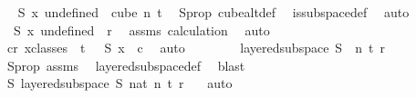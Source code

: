 \begin{isabellebody}
\ \isamarkupfalse%
\ {\isachardoublequoteopen}S\ {\isacharparenleft}{\kern0pt}{\isasymlambda}x{\isachardot}{\kern0pt}\ undefined{\isacharparenright}{\kern0pt}\ {\isasymin}\ cube\ n\ {\isacharparenleft}{\kern0pt}t{\isacharplus}{\kern0pt}{}{\isacharparenright}{\kern0pt}{\isachardoublequoteclose}\ \isamarkupfalse%
\ S{\isacharunderscore}{\kern0pt}prop\ cube{}{\isacharunderscore}{\kern0pt}alt{\isacharunderscore}{\kern0pt}def\ \isamarkupfalse%
\ is{\isacharunderscore}{\kern0pt}subspace{\isacharunderscore}{\kern0pt}def\ \isamarkupfalse%
\ auto\isanewline
\ \ \ \ \isamarkupfalse%
\ \isamarkupfalse%
\ {\isachardoublequoteopen}{\isasymchi}\ {\isacharparenleft}{\kern0pt}S\ {\isacharparenleft}{\kern0pt}{\isasymlambda}x{\isachardot}{\kern0pt}\ undefined{\isacharparenright}{\kern0pt}{\isacharparenright}{\kern0pt}\ {\isacharless}{\kern0pt}\ r{\isachardoublequoteclose}\ \isamarkupfalse%
\ assms\ calculation\ \isamarkupfalse%
\ auto\isanewline
\ \ \ \ \isamarkupfalse%
\ \isamarkupfalse%
\ {\isachardoublequoteopen}{\isasymexists}c{\isacharless}{\kern0pt}r{\isachardot}{\kern0pt}\ {\isasymforall}x{\isasymin}classes\ {}\ t\ {}{\isachardot}{\kern0pt}\ {\isasymchi}\ {\isacharparenleft}{\kern0pt}S\ x{\isacharparenright}{\kern0pt}\ {\isacharequal}{\kern0pt}\ c{\isachardoublequoteclose}\ \isamarkupfalse%
\ auto\isanewline
\ \ \isamarkupfalse%
\isanewline
\ \ \isamarkupfalse%
\ \isamarkupfalse%
\ {\isachardoublequoteopen}layered{\isacharunderscore}{\kern0pt}subspace\ S\ {}\ n\ t\ r\ {\isasymchi}{\isachardoublequoteclose}\ \isamarkupfalse%
\ S{\isacharunderscore}{\kern0pt}prop\ assms\ \isamarkupfalse%
\ layered{\isacharunderscore}{\kern0pt}subspace{\isacharunderscore}{\kern0pt}def\ \isamarkupfalse%
\ blast\isanewline
\ \ \isamarkupfalse%
\ \isamarkupfalse%
\ {\isachardoublequoteopen}{\isasymexists}S{\isachardot}{\kern0pt}\ layered{\isacharunderscore}{\kern0pt}subspace\ S\ {\isacharparenleft}{\kern0pt}{}{\isacharcolon}{\kern0pt}{\isacharcolon}{\kern0pt}nat{\isacharparenright}{\kern0pt}\ n\ t\ r\ {\isasymchi}{\isachardoublequoteclose}\ \isamarkupfalse%
\ auto\isanewline
{}\isamarkupfalse%
%
\endisatagproof
{\isafoldproof}%
%
\isadelimproof
\isanewline

\end{isabellebody}
